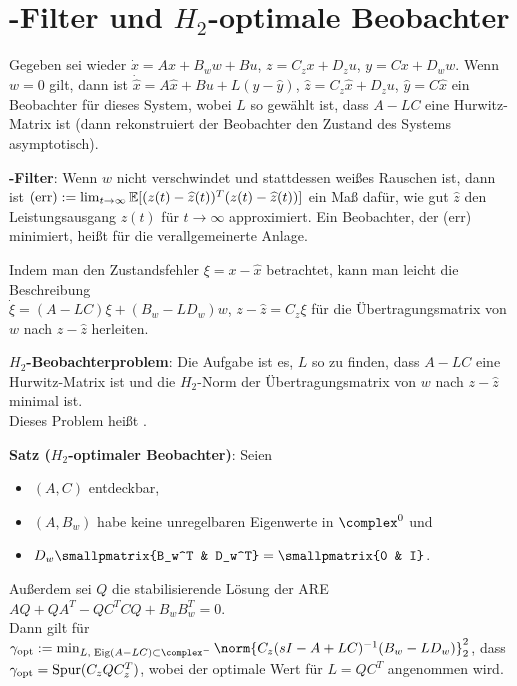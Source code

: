 \pagebreak

\section{%
    -Filter und \texorpdfstring{$H_2$-optimale}{H₂-optimale} Beobachter%
}

Gegeben sei wieder $\dot{x} = Ax + B_w w + Bu$,
$z = C_z x + D_z u$, $y = Cx + D_w w$.
Wenn $w = 0$ gilt, dann ist
$\dot{\widehat{x}} = A\widehat{x} + Bu + L(y - \widehat{y})$,
$\widehat{z} = C_z \widehat{x} + D_z u$,
$\widehat{y} = C\widehat{x}$
ein Beobachter für dieses System, wobei $L$ so gewählt ist, dass $A - LC$ eine Hurwitz-Matrix ist
(dann rekonstruiert der Beobachter den Zustand des Systems asymptotisch).

\textbf{-Filter}:
Wenn $w$ nicht verschwindet und stattdessen weißes Rauschen ist, dann ist
$\text{(err)} := \lim_{t \to \infty} \mathbb{E}[(z(t) - \widehat{z}(t))^T (z(t) - \widehat{z}(t))]$
ein Maß dafür, wie gut $\widehat{z}$ den Leistungsausgang $z(t)$ für $t \to \infty$ approximiert.
Ein Beobachter, der (err) minimiert, heißt  für die
verallgemeinerte Anlage.

Indem man den Zustandsfehler $\xi = x - \widehat{x}$ betrachtet, kann man leicht die Beschreibung\\
$\dot{\xi} = (A - LC)\xi + (B_w - LD_w) w$,
$z - \widehat{z} = C_z \xi$
für die Übertragungsmatrix von $w$ nach $z - \widehat{z}$ herleiten.

\textbf{$H_2$-Beobachterproblem}:
Die Aufgabe ist es, $L$ so zu finden, dass
$A - LC$ eine Hurwitz-Matrix ist und die $H_2$-Norm der Übertragungsmatrix von $w$ nach
$z - \widehat{z}$ minimal ist.\\
Dieses Problem heißt .

\linie

\textbf{Satz ($H_2$-optimaler Beobachter)}:
Seien
\begin{itemize}
    \item
    $(A, C)$ entdeckbar,

    \item
    $(A, B_w)$ habe keine unregelbaren Eigenwerte in $\complex^0$ und

    \item
    $D_w \smallpmatrix{B_w^T & D_w^T} = \smallpmatrix{0 & I}$.
\end{itemize}
Außerdem sei $Q$ die stabilisierende Lösung der ARE $AQ + QA^T - QC^T CQ + B_w B_w^T = 0$.\\
Dann gilt für
$\gamma_\opt := \min_{L,\;\Eig(A-LC)\subset\complex^-}
\norm{C_z (sI - A + LC)^{-1} (B_w - LD_w)}_2^2$, dass\\
$\gamma_{\text{opt}} = \operatorname{Spur}(C_z Q C_z^T)$, wobei der optimale Wert für $L = QC^T$ angenommen wird.

